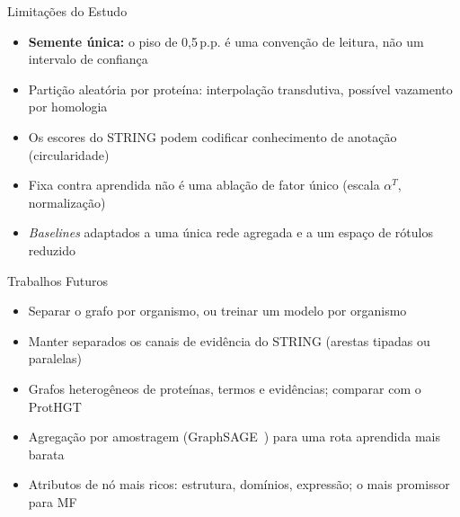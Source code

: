 \documentclass[aspectratio=169,11pt]{beamer}
\begin{document}
\begin{frame}{Limitações do Estudo}
  \begin{itemize}\setlength{\itemsep}{0.45em}
    \item \textbf{Semente única:} o piso de 0,5\,p.p. é uma convenção de leitura, não um intervalo de confiança
    \item Partição aleatória por proteína: interpolação transdutiva, possível vazamento por homologia
    \item Os escores do STRING podem codificar conhecimento de anotação (circularidade)
    \item Fixa contra aprendida não é uma ablação de fator único (escala $\alpha^{T}$, normalização)
    \item \textit{Baselines} adaptados a uma única rede agregada e a um espaço de rótulos reduzido
  \end{itemize}
\end{frame}

\begin{frame}{Trabalhos Futuros}
  \begin{itemize}\setlength{\itemsep}{0.45em}
    \item Separar o grafo por organismo, ou treinar um modelo por organismo
    \item Manter separados os canais de evidência do STRING (arestas tipadas ou paralelas)
    \item Grafos heterogêneos de proteínas, termos e evidências; comparar com o ProtHGT~\cite{ulusoy2025prothgt}
    \item Agregação por amostragem (GraphSAGE~\cite{hamilton2017graphsage}) para uma rota aprendida mais barata
    \item Atributos de nó mais ricos: estrutura, domínios, expressão; o mais promissor para MF
  \end{itemize}
\end{frame}
\end{document}
